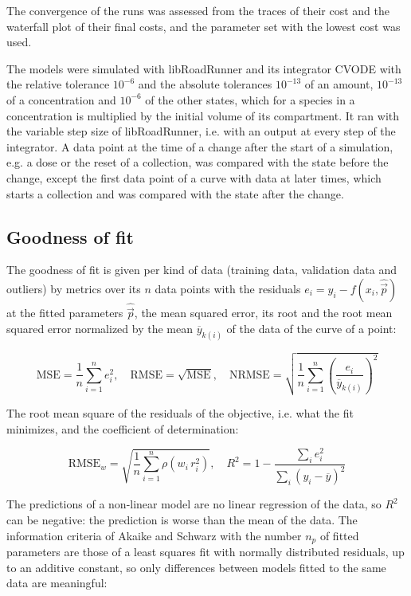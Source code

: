 \documentclass{article}
\begin{document}
The convergence of the runs was assessed from the traces of their cost and the waterfall plot of their final costs, and the parameter set with the lowest cost was used.

The models were simulated with libRoadRunner \cite{Welsh2023} and its integrator CVODE \cite{Hindmarsh2005} with the relative tolerance $10^{-6}$ and the absolute tolerances $10^{-13}$ of an amount, $10^{-13}$ of a concentration and $10^{-6}$ of the other states, which for a species in a concentration is multiplied by the initial volume of its compartment. It ran with the variable step size of libRoadRunner, i.e. with an output at every step of the integrator. A data point at the time of a change after the start of a simulation, e.g. a dose or the reset of a collection, was compared with the state before the change, except the first data point of a curve with data at later times, which starts a collection and was compared with the state after the change.

\subsection{Goodness of fit}

The goodness of fit is given per kind of data (training data, validation data and outliers) by metrics over its $n$ data points with the residuals $e_i = y_i - f(x_i, \hat{\vec{p}})$ at the fitted parameters $\hat{\vec{p}}$, the mean squared error, its root and the root mean squared error normalized by the mean $\overline{y}_{k(i)}$ of the data of the curve of a point:

\begin{equation}
\mathrm{MSE} = \frac{1}{n} \sum_{i=1}^{n} e_i^2, \quad \mathrm{RMSE} = \sqrt{\mathrm{MSE}}, \quad \mathrm{NRMSE} = \sqrt{\frac{1}{n} \sum_{i=1}^{n} \left(\frac{e_i}{\overline{y}_{k(i)}}\right)^2}
\end{equation}

The root mean square of the residuals of the objective, i.e. what the fit minimizes, and the coefficient of determination:

\begin{equation}
\mathrm{RMSE}_w = \sqrt{\frac{1}{n} \sum_{i=1}^{n} \rho\left(w_i\, r_i^2\right)}, \quad R^2 = 1 - \frac{\sum_{i} e_i^2}{\sum_{i} \left(y_i - \overline{y}\right)^2}
\end{equation}

The predictions of a non-linear model are no linear regression of the data, so $R^2$ can be negative: the prediction is worse than the mean of the data. The information criteria of Akaike \cite{Akaike1974} and Schwarz \cite{Schwarz1978} with the number $n_p$ of fitted parameters are those of a least squares fit with normally distributed residuals, up to an additive constant, so only differences between models fitted to the same data are meaningful:
\end{document}
